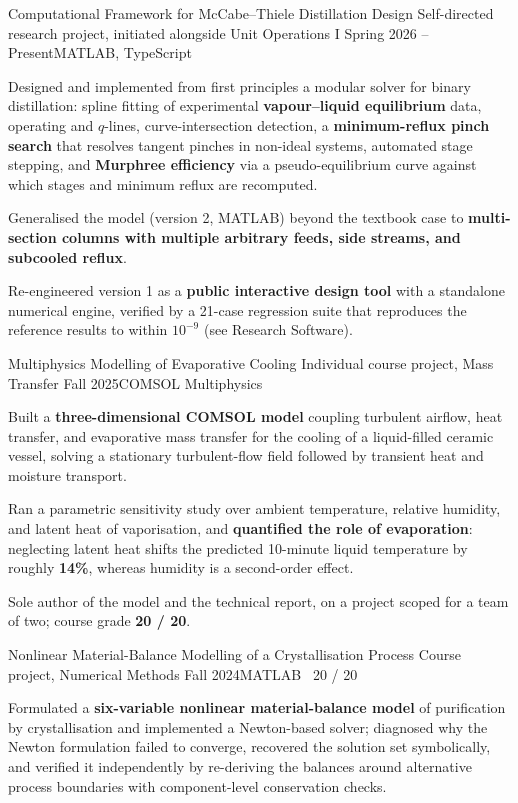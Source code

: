 \documentclass[a4paper,11pt]{article}
\begin{document}
  \cvProject
    {Computational Framework for McCabe--Thiele Distillation Design}
    {Self-directed research project, initiated alongside Unit Operations I}
    {Spring 2026 -- Present}{MATLAB, TypeScript}
    \cvBulletsStart
      \item Designed and implemented from first principles a modular solver for binary distillation: spline fitting of experimental \textbf{vapour--liquid equilibrium} data, operating and $q$-lines, curve-intersection detection, a \textbf{minimum-reflux pinch search} that resolves tangent pinches in non-ideal systems, automated stage stepping, and \textbf{Murphree efficiency} via a pseudo-equilibrium curve against which stages and minimum reflux are recomputed.
      \item Generalised the model (version 2, MATLAB) beyond the textbook case to \textbf{multi-section columns with multiple arbitrary feeds, side streams, and subcooled reflux}.
      \item Re-engineered version 1 as a \textbf{public interactive design tool} with a standalone numerical engine, verified by a 21-case regression suite that reproduces the reference results to within $10^{-9}$ (see Research Software).
    \cvBulletsEnd

  \cvProject
    {Multiphysics Modelling of Evaporative Cooling}
    {Individual course project, Mass Transfer}
    {Fall 2025}{COMSOL Multiphysics}
    \cvBulletsStart
      \item Built a \textbf{three-dimensional COMSOL model} coupling turbulent airflow, heat transfer, and evaporative mass transfer for the cooling of a liquid-filled ceramic vessel, solving a stationary turbulent-flow field followed by transient heat and moisture transport.
      \item Ran a parametric sensitivity study over ambient temperature, relative humidity, and latent heat of vaporisation, and \textbf{quantified the role of evaporation}: neglecting latent heat shifts the predicted 10-minute liquid temperature by roughly \textbf{14\%}, whereas humidity is a second-order effect.
      \item Sole author of the model and the technical report, on a project scoped for a team of two; course grade \textbf{20 / 20}.
    \cvBulletsEnd

  \cvProject
    {Nonlinear Material-Balance Modelling of a Crystallisation Process}
    {Course project, Numerical Methods}
    {Fall 2024}{MATLAB \textperiodcentered\ 20 / 20}
    \cvBulletsStart
      \item Formulated a \textbf{six-variable nonlinear material-balance model} of purification by crystallisation and implemented a Newton-based solver; diagnosed why the Newton formulation failed to converge, recovered the solution set symbolically, and verified it independently by re-deriving the balances around alternative process boundaries with component-level conservation checks.
    \cvBulletsEnd
\end{document}

